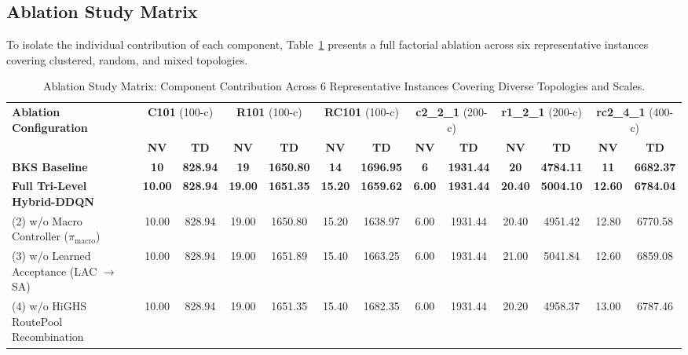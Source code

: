 \subsection{Ablation Study Matrix}
\label{sec:ablation_results}

To isolate the individual contribution of each component, Table~\ref{tab:ablation_matrix} presents a full factorial ablation across six representative instances covering clustered, random, and mixed topologies.

\begin{table}[!t]
\caption{Ablation Study Matrix: Component Contribution Across 6 Representative Instances Covering Diverse Topologies and Scales.}
\label{tab:ablation_matrix}
\centering
\footnotesize
\begin{tabular*}{\textwidth}{@{\extracolsep{\fill}} l cc cc cc cc cc cc @{}}
\toprule
\multirow{2}{*}{\textbf{Ablation Configuration}} & \multicolumn{2}{c}{\textbf{C101} (100-c)} & \multicolumn{2}{c}{\textbf{R101} (100-c)} & \multicolumn{2}{c}{\textbf{RC101} (100-c)} & \multicolumn{2}{c}{\textbf{c2\_2\_1} (200-c)} & \multicolumn{2}{c}{\textbf{r1\_2\_1} (200-c)} & \multicolumn{2}{c}{\textbf{rc2\_4\_1} (400-c)} \\
\cmidrule(lr){2-3} \cmidrule(lr){4-5} \cmidrule(lr){6-7} \cmidrule(lr){8-9} \cmidrule(lr){10-11} \cmidrule(lr){12-13}
 & \textbf{NV} & \textbf{TD} & \textbf{NV} & \textbf{TD} & \textbf{NV} & \textbf{TD} & \textbf{NV} & \textbf{TD} & \textbf{NV} & \textbf{TD} & \textbf{NV} & \textbf{TD} \\
\midrule
\textbf{BKS Baseline} & \textbf{10} & \textbf{828.94} & \textbf{19} & \textbf{1650.80} & \textbf{14} & \textbf{1696.95} & \textbf{6} & \textbf{1931.44} & \textbf{20} & \textbf{4784.11} & \textbf{11} & \textbf{6682.37} \\
\midrule
\textbf{Full Tri-Level Hybrid-DDQN} & \textbf{10.00} & \textbf{828.94} & \textbf{19.00} & \textbf{1651.35} & \textbf{15.20} & \textbf{1659.62} & \textbf{6.00} & \textbf{1931.44} & \textbf{20.40} & \textbf{5004.10} & \textbf{12.60} & \textbf{6784.04} \\
(2) w/o Macro Controller ($\pi_{\text{macro}}$) & 10.00 & 828.94 & 19.00 & 1650.80 & 15.20 & 1638.97 & 6.00 & 1931.44 & 20.40 & 4951.42 & 12.80 & 6770.58 \\
(3) w/o Learned Acceptance (LAC $\to$ SA) & 10.00 & 828.94 & 19.00 & 1651.89 & 15.40 & 1663.25 & 6.00 & 1931.44 & 21.00 & 5041.84 & 12.60 & 6859.08 \\
(4) w/o HiGHS RoutePool Recombination & 10.00 & 828.94 & 19.00 & 1651.35 & 15.40 & 1682.35 & 6.00 & 1931.44 & 20.20 & 4958.37 & 13.00 & 6787.46 \\

\end{tabular*}
\end{table}
